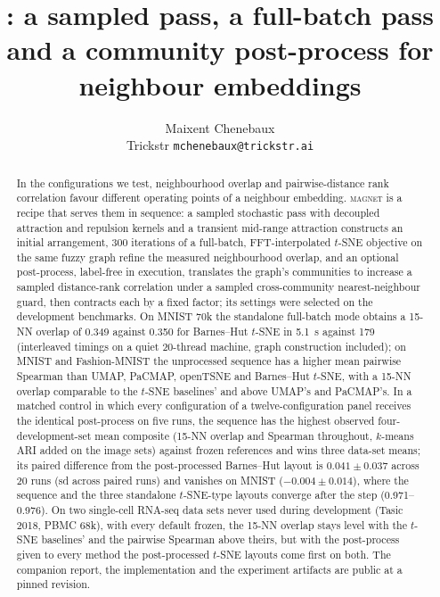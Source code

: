 \documentclass[10pt,twocolumn]{article}
\title{\magnet{}: a sampled pass, a full-batch pass and a community post-process for neighbour embeddings}
\author{Maixent Chenebaux\\ \small Trickstr \quad \texttt{mchenebaux@trickstr.ai}}
\date{}
\newcommand{\magnet}{\textsc{magnet}}
\newcommand{\knn}{15-NN}
\begin{document}
\maketitle

\begin{abstract}
In the configurations we test, neighbourhood overlap and pairwise-distance rank correlation favour different
operating points of a neighbour embedding. \magnet{} is a recipe that serves them in sequence: a sampled
stochastic pass with decoupled attraction and repulsion kernels and a transient mid-range attraction constructs
an initial arrangement, 300 iterations of a full-batch, FFT-interpolated $t$-SNE objective on the same fuzzy graph
refine the measured neighbourhood overlap, and an optional post-process, label-free in execution, translates the graph's communities to increase a
sampled distance-rank correlation under a sampled cross-community nearest-neighbour guard, then contracts each by
a fixed factor; its settings were selected on the development benchmarks. On MNIST 70k the standalone full-batch
mode obtains a \knn{} overlap of 0.349 against 0.350 for Barnes--Hut $t$-SNE in 5.1~s against 179 (interleaved
timings on a quiet 20-thread machine, graph construction included); on MNIST and Fashion-MNIST the unprocessed
sequence has a higher mean pairwise Spearman than UMAP, PaCMAP, openTSNE and Barnes--Hut $t$-SNE, with a \knn{}
overlap comparable to the $t$-SNE baselines' and above UMAP's and PaCMAP's. In a matched control in which every
configuration of a twelve-configuration panel receives the identical post-process on five runs, the sequence has
the highest observed four-development-set mean composite (\knn{} overlap and Spearman throughout, $k$-means ARI
added on the image sets) against frozen references and wins three data-set means; its paired difference from the
post-processed Barnes--Hut layout is $0.041 \pm 0.037$ across 20 runs (sd across paired runs) and vanishes on
MNIST ($-0.004 \pm 0.014$), where the sequence and the three standalone $t$-SNE-type layouts converge after the
step (0.971--0.976). On two single-cell RNA-seq data sets never used during development (Tasic 2018,
PBMC 68k), with every default frozen, the 15-NN overlap stays level with the $t$-SNE baselines' and the pairwise
Spearman above theirs, but with the post-process given to every method the post-processed $t$-SNE layouts come first
on both. The companion report, the implementation and the experiment artifacts are public at a pinned revision.
\end{abstract}
\end{document}

